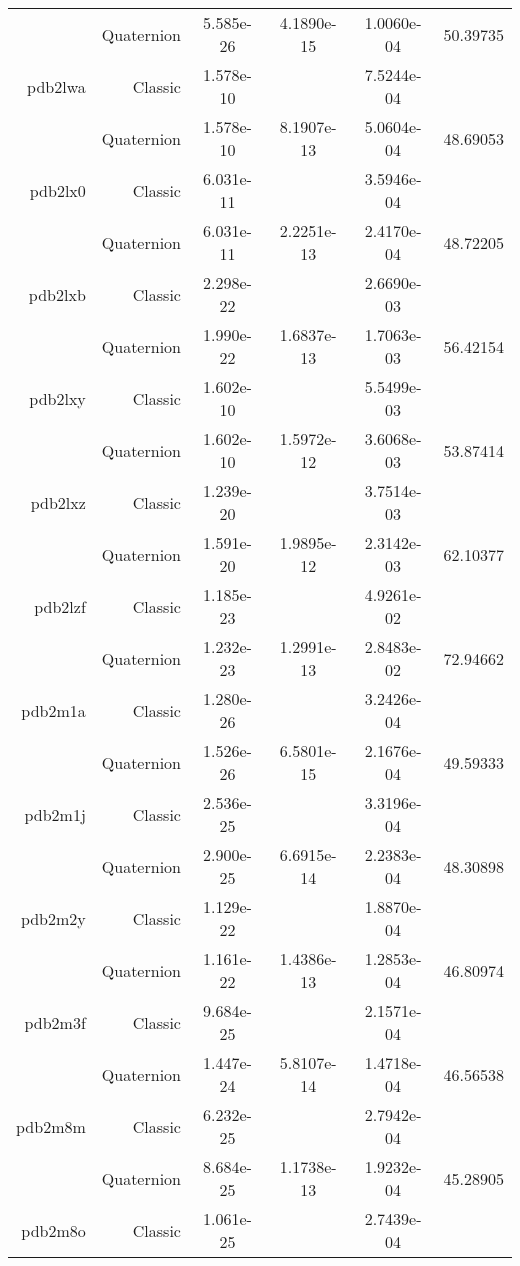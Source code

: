 \begin{xltabular}{\textwidth}{r|rS[table-format=1.3e+2]S[table-format=1.4e+2]S[table-format=1.4e+2]S[table-format=-1.5]}
& Quaternion & 5.585e-26 & 4.1890e-15 & 1.0060e-04 & 50.39735\\  \addlinespace
pdb2lwa & Classic & 1.578e-10 &  & 7.5244e-04 & \\
& Quaternion & 1.578e-10 & 8.1907e-13 & 5.0604e-04 & 48.69053\\  \addlinespace
pdb2lx0 & Classic & 6.031e-11 &  & 3.5946e-04 & \\
& Quaternion & 6.031e-11 & 2.2251e-13 & 2.4170e-04 & 48.72205\\  \addlinespace
pdb2lxb & Classic & 2.298e-22 &  & 2.6690e-03 & \\
& Quaternion & 1.990e-22 & 1.6837e-13 & 1.7063e-03 & 56.42154\\  \addlinespace
pdb2lxy & Classic & 1.602e-10 &  & 5.5499e-03 & \\
& Quaternion & 1.602e-10 & 1.5972e-12 & 3.6068e-03 & 53.87414\\  \addlinespace
pdb2lxz & Classic & 1.239e-20 &  & 3.7514e-03 & \\
& Quaternion & 1.591e-20 & 1.9895e-12 & 2.3142e-03 & 62.10377\\  \addlinespace
pdb2lzf & Classic & 1.185e-23 &  & 4.9261e-02 & \\
& Quaternion & 1.232e-23 & 1.2991e-13 & 2.8483e-02 & 72.94662\\  \addlinespace
pdb2m1a & Classic & 1.280e-26 &  & 3.2426e-04 & \\
& Quaternion & 1.526e-26 & 6.5801e-15 & 2.1676e-04 & 49.59333\\  \addlinespace
pdb2m1j & Classic & 2.536e-25 &  & 3.3196e-04 & \\
& Quaternion & 2.900e-25 & 6.6915e-14 & 2.2383e-04 & 48.30898\\  \addlinespace
pdb2m2y & Classic & 1.129e-22 &  & 1.8870e-04 & \\
& Quaternion & 1.161e-22 & 1.4386e-13 & 1.2853e-04 & 46.80974\\  \addlinespace
pdb2m3f & Classic & 9.684e-25 &  & 2.1571e-04 & \\
& Quaternion & 1.447e-24 & 5.8107e-14 & 1.4718e-04 & 46.56538\\  \addlinespace
pdb2m8m & Classic & 6.232e-25 &  & 2.7942e-04 & \\
& Quaternion & 8.684e-25 & 1.1738e-13 & 1.9232e-04 & 45.28905\\  \addlinespace
pdb2m8o & Classic & 1.061e-25 &  & 2.7439e-04 & \\

\end{xltabular}
